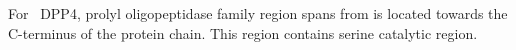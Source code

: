 For~ DPP4, prolyl oligopeptidase family region spans from is located towards the C-terminus of the protein chain. This region contains serine catalytic region.  